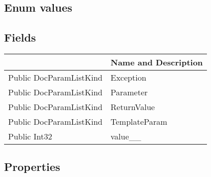 \documentclass[11pt, oneside, a4paper]{book}
\begin{document}
\subsection{Enum values}

\subsection{Fields}
\begin{center}
\begin{tabular}{| p{3cm} | p{12cm} | }
\hline
\textbf{ } & \textbf{ Name and Description}\\
\hline
 Public  DocParamListKind &  Exception\hypertarget{SoftwareEngineeringTools.{}Documentation.{}DocParamListKind.{}Exception}{}\\
\hline
 Public  DocParamListKind &  Parameter\hypertarget{SoftwareEngineeringTools.{}Documentation.{}DocParamListKind.{}Parameter}{}\\
\hline
 Public  DocParamListKind &  ReturnValue\hypertarget{SoftwareEngineeringTools.{}Documentation.{}DocParamListKind.{}ReturnValue}{}\\
\hline
 Public  DocParamListKind &  TemplateParam\hypertarget{SoftwareEngineeringTools.{}Documentation.{}DocParamListKind.{}TemplateParam}{}\\
\hline
 Public  Int32 &  value\_\_\hypertarget{SoftwareEngineeringTools.{}Documentation.{}DocParamListKind.{}value\_\_}{}\\
\hline
\end{tabular}
\end{center}

\subsection{Properties}
\end{document}
